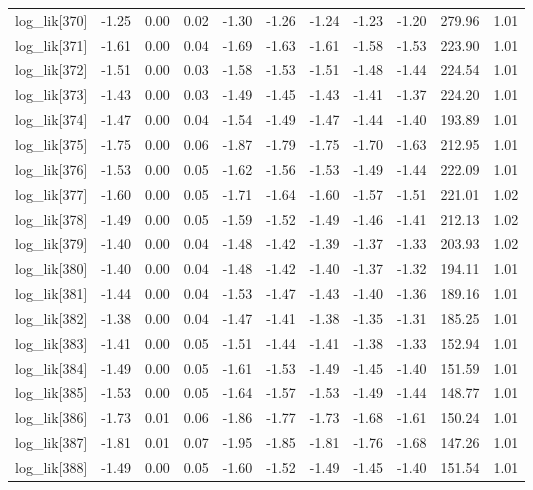 \begin{table}[ht]
\begin{tabular}{rrrrrrrrrrr}
  log\_lik[370] & -1.25 & 0.00 & 0.02 & -1.30 & -1.26 & -1.24 & -1.23 & -1.20 & 279.96 & 1.01 \\ 
  log\_lik[371] & -1.61 & 0.00 & 0.04 & -1.69 & -1.63 & -1.61 & -1.58 & -1.53 & 223.90 & 1.01 \\ 
  log\_lik[372] & -1.51 & 0.00 & 0.03 & -1.58 & -1.53 & -1.51 & -1.48 & -1.44 & 224.54 & 1.01 \\ 
  log\_lik[373] & -1.43 & 0.00 & 0.03 & -1.49 & -1.45 & -1.43 & -1.41 & -1.37 & 224.20 & 1.01 \\ 
  log\_lik[374] & -1.47 & 0.00 & 0.04 & -1.54 & -1.49 & -1.47 & -1.44 & -1.40 & 193.89 & 1.01 \\ 
  log\_lik[375] & -1.75 & 0.00 & 0.06 & -1.87 & -1.79 & -1.75 & -1.70 & -1.63 & 212.95 & 1.01 \\ 
  log\_lik[376] & -1.53 & 0.00 & 0.05 & -1.62 & -1.56 & -1.53 & -1.49 & -1.44 & 222.09 & 1.01 \\ 
  log\_lik[377] & -1.60 & 0.00 & 0.05 & -1.71 & -1.64 & -1.60 & -1.57 & -1.51 & 221.01 & 1.02 \\ 
  log\_lik[378] & -1.49 & 0.00 & 0.05 & -1.59 & -1.52 & -1.49 & -1.46 & -1.41 & 212.13 & 1.02 \\ 
  log\_lik[379] & -1.40 & 0.00 & 0.04 & -1.48 & -1.42 & -1.39 & -1.37 & -1.33 & 203.93 & 1.02 \\ 
  log\_lik[380] & -1.40 & 0.00 & 0.04 & -1.48 & -1.42 & -1.40 & -1.37 & -1.32 & 194.11 & 1.01 \\ 
  log\_lik[381] & -1.44 & 0.00 & 0.04 & -1.53 & -1.47 & -1.43 & -1.40 & -1.36 & 189.16 & 1.01 \\ 
  log\_lik[382] & -1.38 & 0.00 & 0.04 & -1.47 & -1.41 & -1.38 & -1.35 & -1.31 & 185.25 & 1.01 \\ 
  log\_lik[383] & -1.41 & 0.00 & 0.05 & -1.51 & -1.44 & -1.41 & -1.38 & -1.33 & 152.94 & 1.01 \\ 
  log\_lik[384] & -1.49 & 0.00 & 0.05 & -1.61 & -1.53 & -1.49 & -1.45 & -1.40 & 151.59 & 1.01 \\ 
  log\_lik[385] & -1.53 & 0.00 & 0.05 & -1.64 & -1.57 & -1.53 & -1.49 & -1.44 & 148.77 & 1.01 \\ 
  log\_lik[386] & -1.73 & 0.01 & 0.06 & -1.86 & -1.77 & -1.73 & -1.68 & -1.61 & 150.24 & 1.01 \\ 
  log\_lik[387] & -1.81 & 0.01 & 0.07 & -1.95 & -1.85 & -1.81 & -1.76 & -1.68 & 147.26 & 1.01 \\ 
  log\_lik[388] & -1.49 & 0.00 & 0.05 & -1.60 & -1.52 & -1.49 & -1.45 & -1.40 & 151.54 & 1.01 \\ 

\end{tabular}
\end{table}

